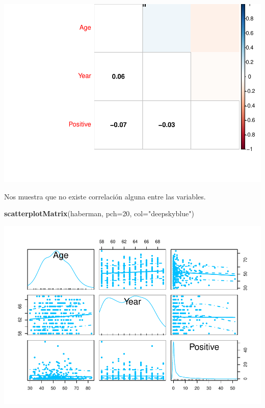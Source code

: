 \documentclass[
]{article}
\newenvironment{Shaded}{\begin{snugshade}}{\end{snugshade}}
\newcommand{\DataTypeTok}[1]{\textcolor[rgb]{0.13,0.29,0.53}{#1}}
\newcommand{\DecValTok}[1]{\textcolor[rgb]{0.00,0.00,0.81}{#1}}
\newcommand{\KeywordTok}[1]{\textcolor[rgb]{0.13,0.29,0.53}{\textbf{#1}}}
\newcommand{\NormalTok}[1]{#1}
\newcommand{\StringTok}[1]{\textcolor[rgb]{0.31,0.60,0.02}{#1}}
\begin{document}
\begin{center}\includegraphics{EDA2_files/figure-latex/unnamed-chunk-27-2} \end{center}

Nos muestra que no existe correlación alguna entre las variables.

\begin{Shaded}
\begin{Highlighting}[]
\KeywordTok{scatterplotMatrix}\NormalTok{(haberman, }\DataTypeTok{pch=}\DecValTok{20}\NormalTok{, }\DataTypeTok{col=}\StringTok{"deepskyblue"}\NormalTok{)}
\end{Highlighting}
\end{Shaded}

\begin{center}\includegraphics{EDA2_files/figure-latex/unnamed-chunk-28-1} \end{center}
\end{document}
